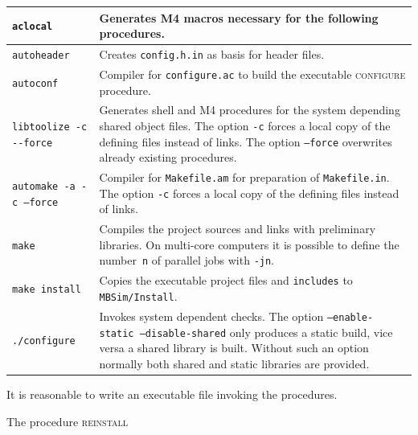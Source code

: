 	\begin{tabular}{|l|p{100mm}|}
	\hline
		\texttt{aclocal} & Generates M4 macros necessary for the following procedures.\\\hline
		\texttt{autoheader} & Creates \texttt{config.h.in} as basis for header files.\\\hline
		\texttt{autoconf} & Compiler for \texttt{configure.ac} to build the executable \textsc{configure} procedure.\\\hline
		\verb|libtoolize -c --force| & Generates shell and M4 procedures for the system depending shared object files. The option \texttt{-c} forces a local copy of the defining files instead of links. The option \texttt{--force} overwrites already existing procedures.\\\hline
		\texttt{automake -a -c --force} & Compiler for \texttt{Makefile.am} for preparation of \texttt{Makefile.in}. The option \texttt{-c} forces a local copy of the defining files instead of links.\\\hline
		\texttt{make} & Compiles the project sources and links with preliminary libraries. On multi-core computers it is possible to define the number~\texttt{n} of parallel jobs with \texttt{-jn}.\\\hline
		\texttt{make install} & Copies the executable project files and \texttt{includes} to \texttt{MBSim/Install}.\\\hline 
        \texttt{./configure} & Invokes system dependent checks. The option \texttt{--enable-static --disable-shared} only produces a static build, vice versa a shared library is built. Without such an option normally both shared and static libraries are provided.\\\hline
	\end{tabular}
\par It is reasonable to write an executable file invoking the procedures.\\
\par The procedure \textsc{reinstall}
